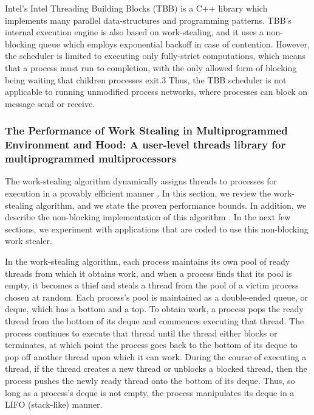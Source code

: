 Intel's Intel Threading Building Blocks (TBB) \cite{Reinders2007,
  Contreras2008} is a C++ library which implements many parallel
data-structures and programming patterns. TBB's internal execution
engine is also based on work-stealing, and it uses a non-blocking
queue which employs exponential backoff in case of
contention. However, the scheduler is limited to executing only
fully-strict computations, which means that a process must run to
completion, with the only allowed form of blocking being waiting that
children processes exit.3 Thus, the TBB scheduler is not applicable to
running unmodified process networks, where processes can block on
message send or receive.

\subsubsection{The Performance of Work Stealing in Multiprogrammed
  Environment \cite{Blumofe1998a} and Hood: A user-level threads
  library for multiprogrammed multiprocessors \cite{Blumofe1998}}

The work-stealing algorithm dynamically assigns threads to processes
for execution in a provably efficient manner \cite{Blumofe1995,
  Blumofe1999}. In this section, we review the work-stealing
algorithm, and we state the proven performance bounds. In addition, we
describe the non-blocking implementation of this algorithm
\cite{Arora2001}. In the next few sections, we experiment with
applications that are coded to use this non-blocking work stealer.


In the work-stealing algorithm, each process maintains its own pool of
ready threads from which it obtains work, and when a process finds
that its pool is empty, it becomes a thief and steals a thread from
the pool of a victim process chosen at random. Each process's pool is
maintained as a double-ended queue, or deque, which has a bottom and a
top. To obtain work, a process pops the ready thread from the bottom
of its deque and commences executing that thread. The process
continues to execute that thread until the thread either blocks or
terminates, at which point the process goes back to the bottom of its
deque to pop off another thread upon which it can work. During the
course of executing a thread, if the thread creates a new thread or
unblocks a blocked thread, then the process pushes the newly ready
thread onto the bottom of its deque.  Thus, so long as a process's
deque is not empty, the process manipulates its deque in a LIFO
(stack-like) manner.

